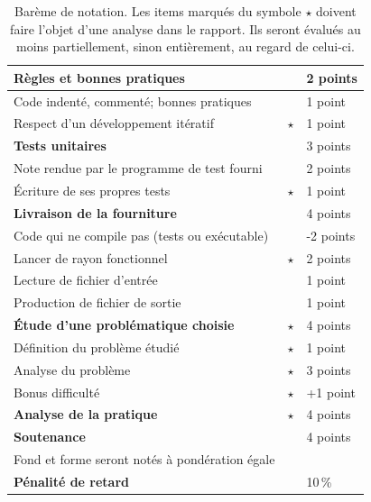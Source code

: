 \documentclass[10pt, a4paper ]{article}
\begin{document}
\begin{table}
    \centering
    \begin{tabular}[hb]{|lcl|}
        \hline
        \textbf{Règles et bonnes pratiques} && 2 points\\\hline
        Code indenté, commenté; bonnes pratiques && 1 point\\
        Respect d'un développement itératif &$\star$& 1 point \\\hline\hline
        \textbf{Tests unitaires} && 3 points\\\hline
        Note rendue par le programme de test fourni && 2 points\\
        Écriture de ses propres tests & $\star$  & 1 point\\\hline\hline
        \textbf{Livraison de la fourniture} && 4 points\\\hline
        Code qui ne compile pas (tests ou exécutable) && {\color{red} -2 points}\\
        Lancer de rayon fonctionnel & $\star$ & 2 points\\
        Lecture de fichier d'entrée && 1 point\\
        Production de fichier de sortie && 1 point\\\hline\hline
        \textbf{Étude d'une problématique choisie} & $\star$ & 4 points\\\hline
        Définition du problème étudié & $\star$ & 1 point \\
        Analyse du problème & $\star$ & 3 points \\
        Bonus difficulté & $\star$ & +1 point \\\hline\hline
        \textbf{Analyse de la pratique} & $\star$ & 4 points\\\hline\hline
        \textbf{Soutenance} & & 4 points\\\hline
        Fond et forme seront notés à pondération égale &&\\\hline\hline
        \textbf{Pénalité de retard} & & 10\,\%\\\hline

    \end{tabular}

    \caption{Barème de notation. Les items marqués du symbole $\star$ doivent
    faire l'objet d'une analyse dans le rapport. Ils seront évalués au moins
partiellement, sinon entièrement,  au regard de celui-ci.}

    \label{tab:bareme}
\end{table}
\end{document}

